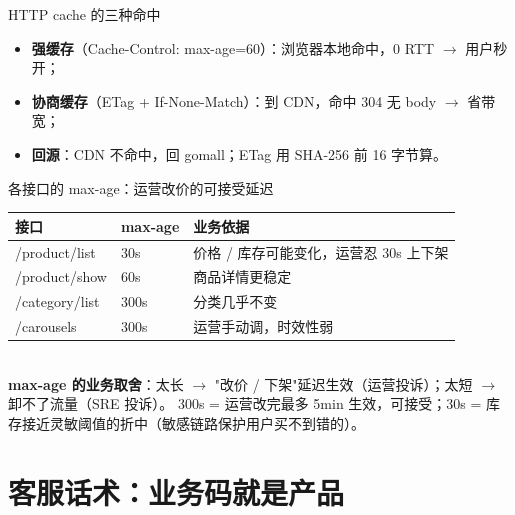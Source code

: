 \documentclass[aspectratio=169,11pt]{beamer}
\begin{document}
\begin{frame}[shrink]{HTTP cache 的三种命中}
\vspace{2mm}
\begin{itemize}
  \item \textbf{强缓存}（Cache-Control: max-age=60）：浏览器本地命中，0 RTT $\to$ 用户秒开；
  \item \textbf{协商缓存}（ETag + If-None-Match）：到 CDN，命中 304 无 body $\to$ 省带宽；
  \item \textbf{回源}：CDN 不命中，回 gomall；ETag 用 SHA-256 前 16 字节算。
\end{itemize}
\end{frame}

\begin{frame}[shrink]{各接口的 max-age：运营改价的可接受延迟}
\begin{tabular}{@{}p{2.6cm}p{1.6cm}p{6.6cm}@{}}
\toprule
接口 & max-age & 业务依据 \\
\midrule
/product/list   & 30s  & 价格 / 库存可能变化，运营忍 30s 上下架 \\
/product/show   & 60s  & 商品详情更稳定 \\
/category/list  & 300s & 分类几乎不变 \\
/carousels      & 300s & 运营手动调，时效性弱 \\
\bottomrule
\end{tabular}
\vspace{2mm}\\
\small \textbf{max-age 的业务取舍}：太长 $\to$ "改价 / 下架"延迟生效（运营投诉）；太短 $\to$ 卸不了流量（SRE 投诉）。
300s = 运营改完最多 5min 生效，可接受；30s = 库存接近灵敏阈值的折中（敏感链路保护用户买不到错的）。
\end{frame}

\section{客服话术：业务码就是产品}
\end{document}
